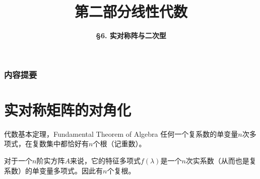 \documentclass[10pt]{beamer}
\title[Linear Algebra]{\LARGE \bfseries 第二部分\quad 线性代数} %
\author[Real Symmetric Matrix and Quadratic Form] %
{\Large \bfseries \S 6. 实对称阵与二次型}
\date{}
\begin{document}

\begin{frame}

\titlepage %

\end{frame}


\begin{frame}
\frametitle{内容提要} %
\tableofcontents %
\end{frame}



\section{实对称矩阵的对角化}


\begin{frame}

\begin{block}{代数基本定理，Fundamental Theorem of Algebra}
任何一个复系数的单变量$n$次多项式，在复数集中都恰好有$n$个根（记重数）。
\end{block}

\vspace{2em}
\pause

对于一个$n$阶实方阵$A$来说，它的特征多项式$f(\lambda)$是一个$n$次实系数（从而也是复系数）的单变量多项式。因此有$n$个复根。

\end{frame}

\end{document}
